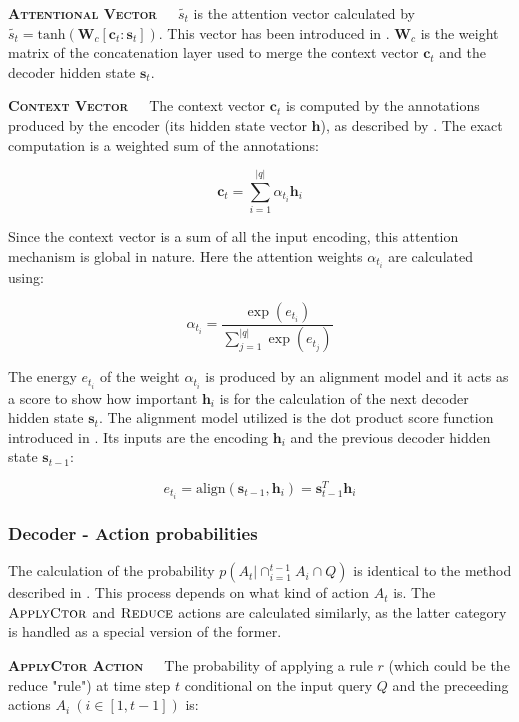 \textbf{\textsc{Attentional Vector}}\ \ \ \(\tilde{s_{t}}\) is the attention vector
calculated by \(\tilde{s_{t}} = \text{tanh}(\textbf{W}_{c}[\textbf{c}_{t} :
\textbf{s}_{t}])\). This vector has been introduced in \cite{LuongPhamManning2015}. %
\(\textbf{W}_{c}\) is the weight matrix of the concatenation layer used to
merge the context vector \(\textbf{c}_{t}\) and the decoder hidden
state \(\textbf{s}_{t}\).

\textbf{\textsc{Context Vector}}\ \ \ The context vector \(\textbf{c}_{t}\) is
computed by the annotations produced by the encoder (its hidden state vector
\(\textbf{h}\)), as described by \cite{BahdanauChoBengio2014}. The exact computation
is a weighted sum of the annotations:

\[\textbf{c}_{t} = \sum_{i=1}^{|q|}\alpha_{t_{i}}\textbf{h}_{i}\]

Since the context vector is a sum of all the input encoding, this attention
mechanism is global in nature. Here the attention weights \(\alpha_{t_{i}}\)
are calculated using:

\[\alpha_{t_{i}} = \frac{\exp(e_{t_{i}})}{\sum_{j=1}^{|q|}\exp(e_{t_{j}})}\]

The energy \(e_{t_{i}}\) of the weight \(\alpha_{t_{i}}\) is produced by an alignment
model and it acts as a score to show how important \(\textbf{h}_{i}\) is for the
calculation of the next decoder hidden state \(\textbf{s}_{t}\). The alignment
model utilized is the dot product score function introduced in \cite{LuongPhamManning2015}.
Its inputs are the encoding \(\textbf{h}_{i}\) and the previous decoder
hidden state \(\textbf{s}_{t-1}\):

\[e_{t_{i}} = \text{align}(\textbf{s}_{t-1}, \textbf{h}_{i}) = \textbf{s}_{t-1}^{T}\textbf{h}_{i}\]

\subsubsection{Decoder - Action probabilities}

The calculation of the probability \(p(A_{t} | \cap_{i=1}^{t-1} A_{i} \cap Q)\)
is identical to the method described in \cite{YinNeubig2018}. This process
depends on what kind of action \(A_{t}\) is. The \(\textsc{ApplyCtor}\) and
\(\textsc{Reduce}\) actions are calculated similarly, as the latter category
is handled as a special version of the former.

\textbf{\textsc{ApplyCtor Action}}\ \ \ The probability of applying a rule
\(r\) (which could be the reduce "rule") at time step \(t\) conditional
on the input query \(Q\) and the preceeding actions \(A_{i} \ (i \in [1,t-1])\) is:

